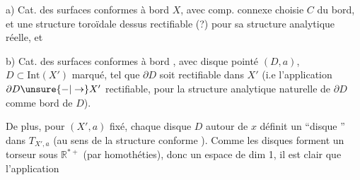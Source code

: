 
a) Cat. des surfaces conformes à bord $X$, avec comp. connexe  choisie $C$ du bord, et une structure toroïdale dessus rectifiable (?) pour sa structure analytique réelle, et

b) Cat. des surfaces conformes à bord , avec  disque pointé $(D,a)$, $D\subset\mathrm{Int}(X')$ marqué, tel que $\partial D$ soit rectifiable dans $X'$ (i.e l'application $\partial D\unsure{-|\to}X'$ rectifiable, pour la structure analytique naturelle de $\partial D$ comme bord de $D$).

De plus, pour $(X',a)$ fixé, chaque disque $D$ autour de $x$ définit un ``disque  '' dans $T_{X',a}$ (au sens de la structure  conforme ). Comme les disques forment un torseur sous $\mathbb R^{*+}$ (par homothéties), donc un espace de dim 1, il est clair que l'application
